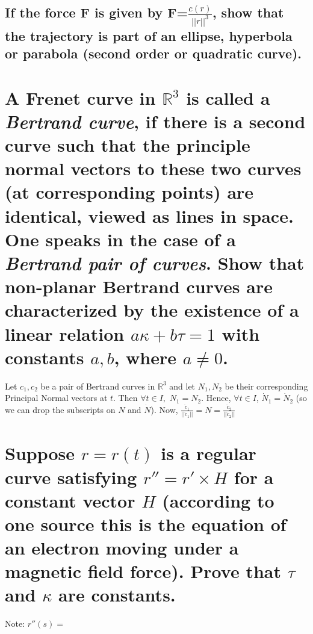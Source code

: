 \documentclass[12pt]{amsart}
\begin{document}
\subsection{If the force \textbf{F} is given by \textbf{F}=$\frac{c(r)}{||r||^3}$, show that the trajectory is part of an ellipse, hyperbola or parabola (second order or quadratic curve).}

\setcounter{equation}{0}
\section{A Frenet curve in $\mathbb{R}^3$ is called a \emph{Bertrand curve}, if there is a second curve such that the principle normal vectors to these two curves (at corresponding points) are identical, viewed as lines in space. One speaks in the case of a \emph{Bertrand pair of curves}. Show that non-planar Bertrand curves are characterized by the existence of a linear relation $a\kappa+b\tau=1$ with constants $a,b$, where $a\neq0$.} Let $c_1,c_2$ be a pair of Bertrand curves in $\mathbb{R}^3$ and let $N_1,N_2$ be their corresponding Principal Normal vectors at $t$. Then $\forall t\in I,$ $N_1=N_2$. Hence, $\forall t\in I$, $\dot N_1=\dot N_2$ (so we can drop the subscripts on $N$ and $\dot N$). Now, $\frac{\ddot c_1}{||\ddot c_1||}=N=\frac{\ddot c_2}{||\ddot c_2||}$
\begin{comment}Since,
\[\left(\begin{array}{c}
	T_1 \\
	N_1 \\
	B_1
\end{array} \right)' =\left(\begin{array}{ccc}
	0 & \kappa_1 & 0 \\
	-\kappa_1 & 0 & \tau_1 \\
	0 & -\tau_1 & 0
\end{array} \right)
\left(\begin{array}{c}
	T_1\\
	N_1\\
	B_1
\end{array}\right) \]
we know, $-\kappa_1T_1+\tau_1B_1=-\kappa_2T_2+\tau_2B_2$, and $\frac{T_1'}{\kappa_1}=\frac{T_2'}{\kappa_2}$
\end{comment}

\section{Suppose $r=r(t)$ is a regular curve satisfying $r''=r'\times H$ for a constant vector $H$ (according to one source this is the equation of an electron moving under a magnetic field force). Prove that $\tau$ and $\kappa$ are constants.}
Note: $r''(s)=$
\end{document}
